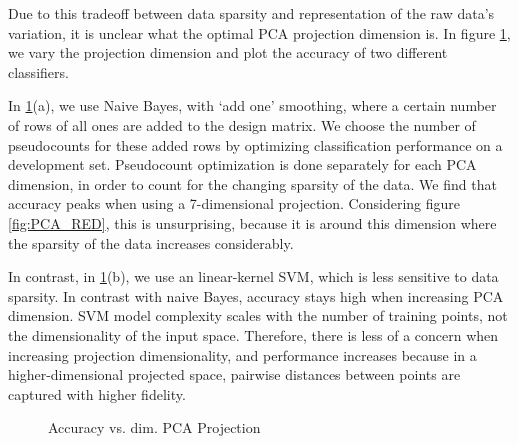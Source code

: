 Due to this tradeoff between data sparsity and representation of the raw data's variation, it is unclear what the optimal PCA projection dimension is. In figure \ref{fig:pca_acc_vs_proj_dim}, we vary the projection dimension and plot the accuracy of two different classifiers. 

In \ref{fig:pca_acc_vs_proj_dim}(a), we use Naive Bayes, with `add one' smoothing, where a certain number of rows of all ones are added to the design matrix. We choose the number of pseudocounts for these added rows by optimizing classification performance on a development set. Pseudocount optimization is done separately for each PCA dimension, in order to count for the changing sparsity of the data. We find that accuracy peaks when using a 7-dimensional projection. Considering figure  \ref{fig:PCA_RED}, this is unsurprising, because it is around this dimension where the sparsity of the data increases considerably. 

In contrast, in \ref{fig:pca_acc_vs_proj_dim}(b), we use an linear-kernel SVM, which is less sensitive to data sparsity. In contrast with naive Bayes, accuracy stays high when increasing PCA dimension. SVM model complexity scales with the number of training points, not the dimensionality of the input space. Therefore, there is less of a concern when increasing projection dimensionality, and performance increases because in a higher-dimensional projected space, pairwise distances between points are captured with higher fidelity. 

\begin{figure}[!ht]
\centering
{}
\caption{Accuracy vs. dim. PCA Projection}
\label{fig:pca_acc_vs_proj_dim}
\end{figure}

